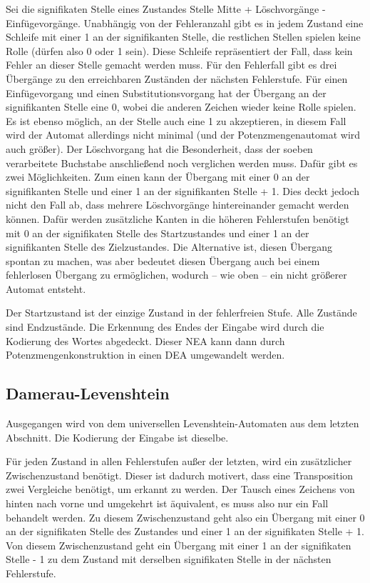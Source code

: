Sei die signifikaten Stelle eines Zustandes Stelle Mitte + Löschvorgänge - Einfügevorgänge. Unabhängig von der Fehleranzahl gibt es in jedem Zustand eine Schleife mit einer 1 an der signifikanten Stelle, die restlichen Stellen spielen keine Rolle (dürfen also 0 oder 1 sein). Diese Schleife repräsentiert der Fall, dass kein Fehler an dieser Stelle gemacht werden muss. Für den Fehlerfall gibt es drei Übergänge zu den erreichbaren Zuständen der nächsten Fehlerstufe. Für einen Einfügevorgang und einen Substitutionsvorgang hat der Übergang an der signifikanten Stelle eine 0, wobei die anderen Zeichen wieder keine Rolle spielen. Es ist ebenso möglich, an der Stelle auch eine 1 zu akzeptieren, in diesem Fall wird der Automat allerdings nicht minimal (und der Potenzmengenautomat wird auch größer). Der Löschvorgang hat die Besonderheit, dass der soeben verarbeitete Buchstabe anschließend noch verglichen werden muss. Dafür gibt es zwei Möglichkeiten. Zum einen kann der Übergang mit einer 0 an der signifikanten Stelle und einer 1 an der signifikanten Stelle + 1. Dies deckt jedoch nicht den Fall ab, dass mehrere Löschvorgänge hintereinander gemacht werden können. Dafür werden zusätzliche Kanten in die höheren Fehlerstufen benötigt mit 0 an der signifikaten Stelle des Startzustandes und einer 1 an der signifikanten Stelle des Zielzustandes. Die Alternative ist, diesen Übergang spontan zu machen, was aber bedeutet diesen Übergang auch bei einem fehlerlosen Übergang zu ermöglichen, wodurch -- wie oben -- ein nicht größerer Automat entsteht.

Der Startzustand ist der einzige Zustand in der fehlerfreien Stufe. Alle Zustände sind Endzustände. Die Erkennung des Endes der Eingabe wird durch die Kodierung des Wortes abgedeckt. Dieser NEA kann dann durch Potenzmengenkonstruktion in einen DEA umgewandelt werden.
\subsection{Damerau-Levenshtein}
Ausgegangen wird von dem universellen Levenshtein-Automaten aus dem letzten Abschnitt. Die Kodierung der Eingabe ist dieselbe.

Für jeden Zustand in allen Fehlerstufen außer der letzten, wird ein zusätzlicher Zwischenzustand benötigt. Dieser ist dadurch motivert, dass eine Transposition zwei Vergleiche benötigt, um erkannt zu werden. Der Tausch eines Zeichens von hinten nach vorne und umgekehrt ist äquivalent, es muss also nur ein Fall behandelt werden. Zu diesem Zwischenzustand geht also ein Übergang mit einer 0 an der signifikaten Stelle des Zustandes und einer 1 an der signifikaten Stelle + 1. Von diesem Zwischenzustand geht ein Übergang mit einer 1 an der signifikaten Stelle - 1 zu dem Zustand mit derselben signifikaten Stelle in der nächsten Fehlerstufe.

